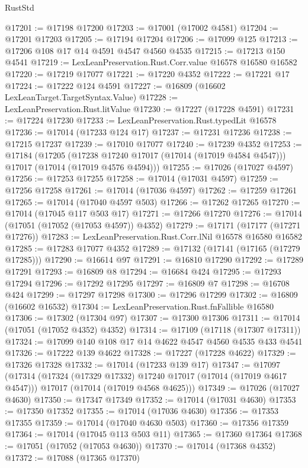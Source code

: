 \begin{lexlean}{RustStd}
\begin{coremodule}
{\begin{coremodule}
{{{{{{{{{{{{{{{{{{{{{{{{{{{{{{{{{{{{{{{{{{{{{{{{{{{{{{{@17201 := @17198 @17200
@17203 := @17001 (@17002 @4581)
@17204 := @17201 @17203
@17205 := @17194 @17204
@17206 := @17099 @125
@17213 := @17206 @108 @17 @14 @4591 @4547 @4560 @4535
@17215 := @17213 @150 @4541
@17219 := LexLeanPreservation.Rust.Corr.value @16578 @16580 @16582
@17220 := @17219 @17077
@17221 := @17220 @4352
@17222 := @17221 @17
@17224 := @17222 @124 @4591
@17227 := @16809 (@16602 LexLeanTarget.TargetSyntax.Value)
@17228 := LexLeanPreservation.Rust.litValue
@17230 := @17227 (@17228 @4591)
@17231 := @17224 @17230
@17233 := LexLeanPreservation.Rust.typedLit @16578
@17236 := @17014 (@17233 @124 @17)
@17237 := @17231 @17236
@17238 := @17215 @17237
@17239 := @17010 @17077
@17240 := @17239 @4352
@17253 := @17184
    (@17205
      (@17238 @17240 @17017 (@17014 (@17019 @4584 @4547)))
      @17017
      (@17014 (@17019 @4576 @4594)))
@17255 := @17026 (@17027 @4597)
@17256 := @17253 @17255
@17258 := @17014 (@17031 @4597)
@17259 := @17256 @17258
@17261 := @17014 (@17036 @4597)
@17262 := @17259 @17261
@17265 := @17014 (@17040 @4597 @503)
@17266 := @17262 @17265
@17270 := @17014 (@17045 @117 @503 @17)
@17271 := @17266 @17270
@17276 := @17014 (@17051 (@17052 (@17053 @4597)) @4352)
@17279 := @17171 (@17177 (@17271 @17276))
@17283 := LexLeanPreservation.Rust.Corr.lNil @16578 @16580 @16582
@17285 := @17283 @17077 @4352
@17289 := @17132 (@17141 (@17165 (@17279 @17285)))
@17290 := @16614 @97
@17291 := @16810 @17290
@17292 := @17289 @17291
@17293 := @16809 @8
@17294 := @16684 @424
@17295 := @17293 @17294
@17296 := @17292 @17295
@17297 := @16809 @7
@17298 := @16708 @424
@17299 := @17297 @17298
@17300 := @17296 @17299
@17302 := @16809 (@16602 @16532)
@17304 := LexLeanPreservation.Rust.fnFallible @16580
@17306 := @17302 (@17304 @97)
@17307 := @17300 @17306
@17311 := @17014 (@17051 (@17052 @4352) @4352)
@17314 := @17109 (@17118 (@17307 @17311))
@17324 := @17099 @140 @108 @17 @14 @4622 @4547 @4560 @4535 @433 @4541
@17326 := @17222 @139 @4622
@17328 := @17227 (@17228 @4622)
@17329 := @17326 @17328
@17332 := @17014 (@17233 @139 @17)
@17347 := @17097
    (@17314
      (@17324 (@17329 @17332) @17240 @17017 (@17014 (@17019 @4617 @4547)))
      @17017
      (@17014 (@17019 @4568 @4625)))
@17349 := @17026 (@17027 @4630)
@17350 := @17347 @17349
@17352 := @17014 (@17031 @4630)
@17353 := @17350 @17352
@17355 := @17014 (@17036 @4630)
@17356 := @17353 @17355
@17359 := @17014 (@17040 @4630 @503)
@17360 := @17356 @17359
@17364 := @17014 (@17045 @113 @503 @11)
@17365 := @17360 @17364
@17368 := @17051 (@17052 (@17053 @4630))
@17370 := @17014 (@17368 @4352)
@17372 := @17088 (@17365 @17370)
}}}}}}}}}}}}}}}}}}}}}}}}}}}}}}}}}}}}}}}}}}}}}}}}}}}}}}}
\end{coremodule}}
\end{coremodule}
\end{lexlean}
